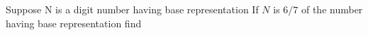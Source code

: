 Suppose N is a digit number having base representation   If $N$ is $6/7$ of the number having base representation  find 